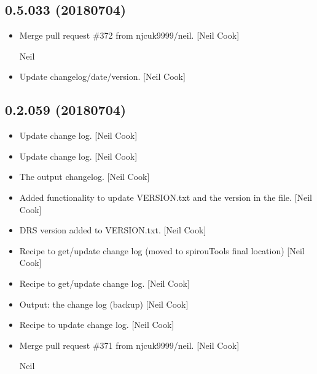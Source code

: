 \documentclass[a4paper,10pt,english]{report}
\begin{document}
\subsection{0.5.033 (2018\sphinxhyphen{}07\sphinxhyphen{}04)}
\label{\detokenize{misc/changelog:id419}}\begin{itemize}
\item {} 
Merge pull request \#372 from njcuk9999/neil. {[}Neil Cook{]}

Neil

\item {} 
Update changelog/date/version. {[}Neil Cook{]}

\end{itemize}


\subsection{0.2.059 (2018\sphinxhyphen{}07\sphinxhyphen{}04)}
\label{\detokenize{misc/changelog:id420}}\begin{itemize}
\item {} 
Update change log. {[}Neil Cook{]}

\item {} 
Update change log. {[}Neil Cook{]}

\item {} 
The output changelog. {[}Neil Cook{]}

\item {} 
Added functionality to update VERSION.txt and the version in the
 file. {[}Neil Cook{]}

\item {} 
DRS version added to VERSION.txt. {[}Neil Cook{]}

\item {} 
Recipe to get/update change log (moved to spirouTools \sphinxhyphen{} final
location) {[}Neil Cook{]}

\item {} 
Recipe to get/update change log. {[}Neil Cook{]}

\item {} 
Output: the change log (backup) {[}Neil Cook{]}

\item {} 
Recipe to update change log. {[}Neil Cook{]}

\item {} 
Merge pull request \#371 from njcuk9999/neil. {[}Neil Cook{]}

Neil

\end{itemize}
\end{document}
